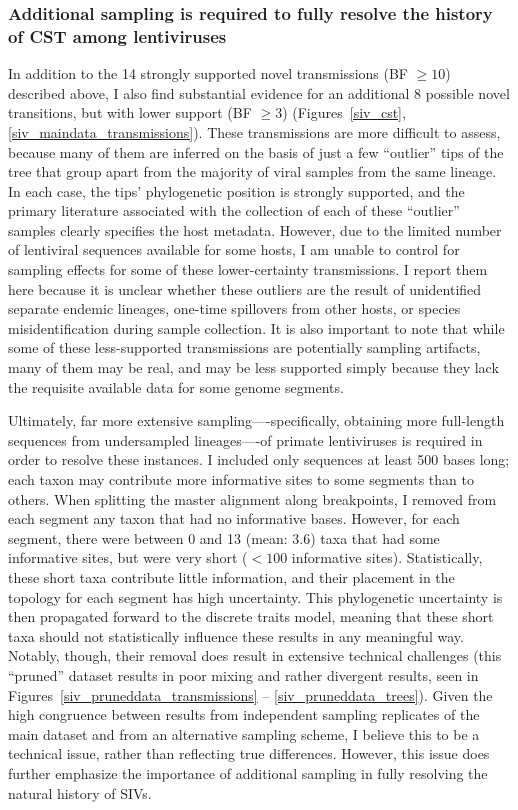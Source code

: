 \subsubsection*{Additional sampling is required to fully resolve the history of CST among lentiviruses}
In addition to the 14 strongly supported novel transmissions (BF $\geq 10$) described above, I also find substantial evidence for an additional 8 possible novel transitions, but with lower support (BF $\geq 3$) (Figures~\ref{siv_cst}, \ref{siv_maindata_transmissions}).
These transmissions are more difficult to assess, because many of them are inferred on the basis of just a few “outlier” tips of the tree that group apart from the majority of viral samples from the same lineage.
In each case, the tips' phylogenetic position is strongly supported, and the primary literature associated with the collection of each of these “outlier” samples clearly specifies the host metadata.
However, due to the limited number of lentiviral sequences available for some hosts, I am unable to control for sampling effects for some of these lower-certainty transmissions.
I report them here because it is unclear whether these outliers are the result of unidentified separate endemic lineages, one-time spillovers from other hosts, or species misidentification during sample collection.
It is also important to note that while some of these less-supported transmissions are potentially sampling artifacts, many of them may be real, and may be less supported simply because they lack the requisite available data for some genome segments.

Ultimately, far more extensive sampling—-specifically, obtaining more full-length sequences from undersampled lineages—-of primate lentiviruses is required in order to resolve these instances.
I included only sequences at least 500 bases long; each taxon may contribute more informative sites to some segments than to others.
When splitting the master alignment along breakpoints, I removed from each segment any taxon that had no informative bases.
However, for each segment, there were between 0 and 13 (mean: 3.6) taxa that had some informative sites, but were very short ($<100$ informative sites).
Statistically, these short taxa contribute little information, and their placement in the topology for each segment has high uncertainty.
This phylogenetic uncertainty is then propagated forward to the discrete traits model, meaning that these short taxa should not statistically influence these results in any meaningful way.
Notably, though, their removal does result in extensive technical challenges (this “pruned” dataset results in poor mixing and rather divergent results, seen in Figures~\ref{siv_pruneddata_transmissions} -- \ref{siv_pruneddata_trees}).
Given the high congruence between results from independent sampling replicates of the main dataset and from an alternative sampling scheme, I believe this to be a technical issue, rather than reflecting true differences.
However, this issue does further emphasize the importance of additional sampling in fully resolving the natural history of SIVs.

